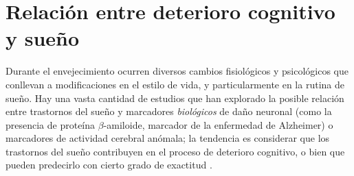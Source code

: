 \documentclass[12pt,letterpaper]{book}
\begin{document}

\section{Relación entre deterioro cognitivo y sueño}
\label{sec:pdcl_sueno}

Durante el envejecimiento ocurren diversos cambios fisiológicos y psicológicos que conllevan a modificaciones en el estilo de vida, y particularmente en la rutina de sueño.
%
%
Hay una vasta cantidad de estudios que han explorado la posible relación entre trastornos del sueño y marcadores \textit{biológicos} de daño neuronal (como la presencia de proteína $\beta$-amiloide, marcador de la enfermedad de Alzheimer) o marcadores de actividad cerebral anómala; la tendencia es considerar que los trastornos del sueño contribuyen en el proceso de deterioro cognitivo, o bien que pueden predecirlo con cierto grado de exactitud \cite{porter15}.
%





%
%
\end{document}
